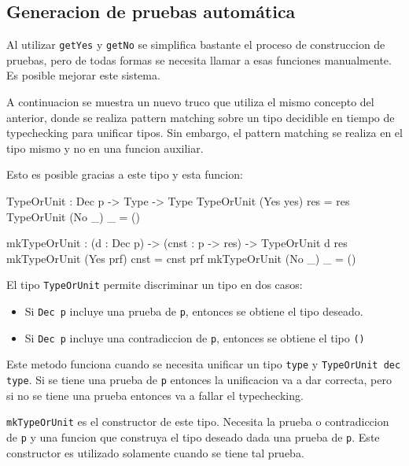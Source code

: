 
\subsection{Generacion de pruebas automática}

Al utilizar \texttt{getYes} y \texttt{getNo} se simplifica bastante el proceso de construccion de pruebas, pero de todas formas se necesita llamar a esas funciones manualmente. Es posible mejorar este sistema.

A continuacion se muestra un nuevo truco que utiliza el mismo concepto del anterior, donde se realiza pattern matching sobre un tipo decidible en tiempo de typechecking para unificar tipos. Sin embargo, el pattern matching se realiza en el tipo mismo y no en una funcion auxiliar.

Esto es posible gracias a este tipo y esta funcion:

\begin{code}
TypeOrUnit : Dec p -> Type -> Type
TypeOrUnit (Yes yes) res = res
TypeOrUnit (No _) _ = ()

mkTypeOrUnit : (d : Dec p) -> (cnst : p -> res) -> 
  TypeOrUnit d res
mkTypeOrUnit (Yes prf) cnst = cnst prf
mkTypeOrUnit (No _) _ = ()
\end{code}

El tipo \texttt{TypeOrUnit} permite discriminar un tipo en dos casos:
\begin{itemize}
\item Si \texttt{Dec p} incluye una prueba de \texttt{p}, entonces se obtiene el tipo deseado.
\item Si \texttt{Dec p} incluye una contradiccion de \texttt{p}, entonces se obtiene el tipo \texttt{()}
\end{itemize}

Este metodo funciona cuando se necesita unificar un tipo \texttt{type} y \texttt{TypeOrUnit dec type}. Si se tiene una prueba de \texttt{p} entonces la unificacion va a dar correcta, pero si no se tiene una prueba entonces va a fallar el typechecking.

\texttt{mkTypeOrUnit} es el constructor de este tipo. Necesita la prueba o contradiccion de \texttt{p} y una funcion que construya el tipo deseado dada una prueba de \texttt{p}. Este constructor es utilizado solamente cuando se tiene tal prueba.

